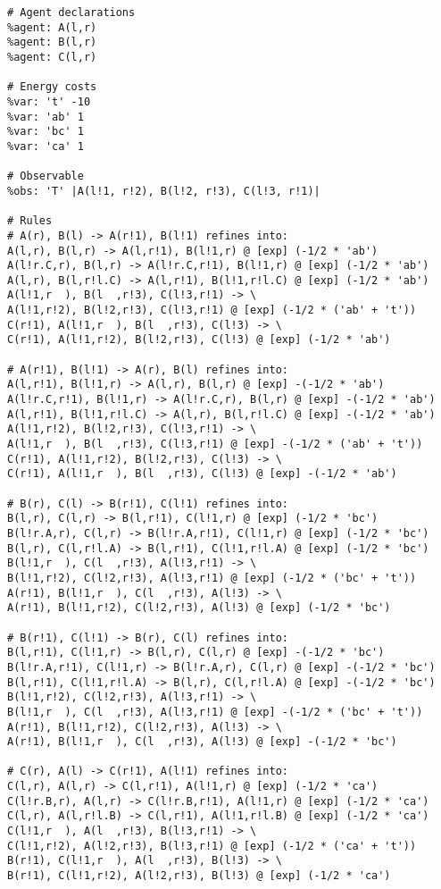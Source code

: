 \begin{lstlisting}
# Agent declarations
%agent: A(l,r)
%agent: B(l,r)
%agent: C(l,r)

# Energy costs
%var: 't' -10
%var: 'ab' 1
%var: 'bc' 1
%var: 'ca' 1

# Observable
%obs: 'T' |A(l!1, r!2), B(l!2, r!3), C(l!3, r!1)|

# Rules
# A(r), B(l) -> A(r!1), B(l!1) refines into:
A(l,r), B(l,r) -> A(l,r!1), B(l!1,r) @ [exp] (-1/2 * 'ab')
A(l!r.C,r), B(l,r) -> A(l!r.C,r!1), B(l!1,r) @ [exp] (-1/2 * 'ab')
A(l,r), B(l,r!l.C) -> A(l,r!1), B(l!1,r!l.C) @ [exp] (-1/2 * 'ab')
A(l!1,r  ), B(l  ,r!3), C(l!3,r!1) -> \
A(l!1,r!2), B(l!2,r!3), C(l!3,r!1) @ [exp] (-1/2 * ('ab' + 't'))
C(r!1), A(l!1,r  ), B(l  ,r!3), C(l!3) -> \
C(r!1), A(l!1,r!2), B(l!2,r!3), C(l!3) @ [exp] (-1/2 * 'ab')

# A(r!1), B(l!1) -> A(r), B(l) refines into:
A(l,r!1), B(l!1,r) -> A(l,r), B(l,r) @ [exp] -(-1/2 * 'ab')
A(l!r.C,r!1), B(l!1,r) -> A(l!r.C,r), B(l,r) @ [exp] -(-1/2 * 'ab')
A(l,r!1), B(l!1,r!l.C) -> A(l,r), B(l,r!l.C) @ [exp] -(-1/2 * 'ab')
A(l!1,r!2), B(l!2,r!3), C(l!3,r!1) -> \
A(l!1,r  ), B(l  ,r!3), C(l!3,r!1) @ [exp] -(-1/2 * ('ab' + 't'))
C(r!1), A(l!1,r!2), B(l!2,r!3), C(l!3) -> \
C(r!1), A(l!1,r  ), B(l  ,r!3), C(l!3) @ [exp] -(-1/2 * 'ab')

# B(r), C(l) -> B(r!1), C(l!1) refines into:
B(l,r), C(l,r) -> B(l,r!1), C(l!1,r) @ [exp] (-1/2 * 'bc')
B(l!r.A,r), C(l,r) -> B(l!r.A,r!1), C(l!1,r) @ [exp] (-1/2 * 'bc')
B(l,r), C(l,r!l.A) -> B(l,r!1), C(l!1,r!l.A) @ [exp] (-1/2 * 'bc')
B(l!1,r  ), C(l  ,r!3), A(l!3,r!1) -> \
B(l!1,r!2), C(l!2,r!3), A(l!3,r!1) @ [exp] (-1/2 * ('bc' + 't'))
A(r!1), B(l!1,r  ), C(l  ,r!3), A(l!3) -> \
A(r!1), B(l!1,r!2), C(l!2,r!3), A(l!3) @ [exp] (-1/2 * 'bc')

# B(r!1), C(l!1) -> B(r), C(l) refines into:
B(l,r!1), C(l!1,r) -> B(l,r), C(l,r) @ [exp] -(-1/2 * 'bc')
B(l!r.A,r!1), C(l!1,r) -> B(l!r.A,r), C(l,r) @ [exp] -(-1/2 * 'bc')
B(l,r!1), C(l!1,r!l.A) -> B(l,r), C(l,r!l.A) @ [exp] -(-1/2 * 'bc')
B(l!1,r!2), C(l!2,r!3), A(l!3,r!1) -> \
B(l!1,r  ), C(l  ,r!3), A(l!3,r!1) @ [exp] -(-1/2 * ('bc' + 't'))
A(r!1), B(l!1,r!2), C(l!2,r!3), A(l!3) -> \
A(r!1), B(l!1,r  ), C(l  ,r!3), A(l!3) @ [exp] -(-1/2 * 'bc')

# C(r), A(l) -> C(r!1), A(l!1) refines into:
C(l,r), A(l,r) -> C(l,r!1), A(l!1,r) @ [exp] (-1/2 * 'ca')
C(l!r.B,r), A(l,r) -> C(l!r.B,r!1), A(l!1,r) @ [exp] (-1/2 * 'ca')
C(l,r), A(l,r!l.B) -> C(l,r!1), A(l!1,r!l.B) @ [exp] (-1/2 * 'ca')
C(l!1,r  ), A(l  ,r!3), B(l!3,r!1) -> \
C(l!1,r!2), A(l!2,r!3), B(l!3,r!1) @ [exp] (-1/2 * ('ca' + 't'))
B(r!1), C(l!1,r  ), A(l  ,r!3), B(l!3) -> \
B(r!1), C(l!1,r!2), A(l!2,r!3), B(l!3) @ [exp] (-1/2 * 'ca')


\end{lstlisting}
